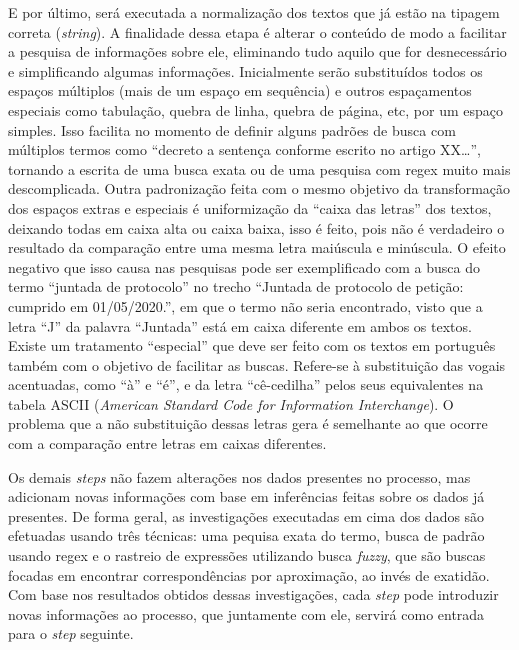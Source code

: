 E por último, será executada a normalização dos textos que já estão na tipagem correta (\textit{string}). A finalidade dessa etapa é alterar o conteúdo de modo a facilitar a pesquisa de informações sobre ele, eliminando tudo aquilo que for desnecessário e simplificando algumas informações. Inicialmente serão substituídos todos os espaços múltiplos (mais de um espaço em sequência) e outros espaçamentos especiais como tabulação, quebra de linha, quebra de página, etc, por um espaço simples. Isso facilita no momento de definir alguns padrões de busca com múltiplos termos como \enquote{decreto a sentença conforme escrito no artigo XX\dots}, tornando a escrita de uma busca exata ou de uma pesquisa com regex muito mais descomplicada. Outra padronização feita com o mesmo objetivo da transformação dos espaços extras e especiais é uniformização da \enquote{caixa das letras} dos textos, deixando todas em caixa alta ou caixa baixa, isso é feito, pois não é verdadeiro o resultado da comparação entre uma mesma letra maiúscula e minúscula. O efeito negativo que isso causa nas pesquisas pode ser exemplificado com a busca do termo \enquote{juntada de protocolo} no trecho \enquote{Juntada de protocolo de petição: cumprido em 01/05/2020.}, em que o termo não seria encontrado, visto que a letra \enquote{J} da palavra \enquote{Juntada} está em caixa diferente em ambos os textos. Existe um tratamento \enquote{especial} que deve ser feito com os textos em português também com o objetivo de facilitar as buscas. Refere-se à substituição das vogais acentuadas, como \enquote{à} e \enquote{é}, e da letra \enquote{cê-cedilha} pelos seus equivalentes na tabela ASCII (\textit{American Standard Code for Information Interchange}). O problema que a não substituição dessas letras gera é semelhante ao que ocorre com a comparação entre letras em caixas diferentes.

Os demais \textit{steps} não fazem alterações nos dados presentes no processo, mas adicionam novas informações com base em inferências feitas sobre os dados já presentes. De forma geral, as investigações executadas em cima dos dados são efetuadas usando três técnicas: uma pequisa exata do termo, busca de padrão usando regex e o rastreio de expressões utilizando busca \textit{fuzzy}, que são buscas focadas em encontrar correspondências por aproximação, ao invés de exatidão. Com base nos resultados obtidos dessas investigações, cada \textit{step} pode introduzir novas informações ao processo, que juntamente com ele, servirá como entrada para o \textit{step} seguinte.

